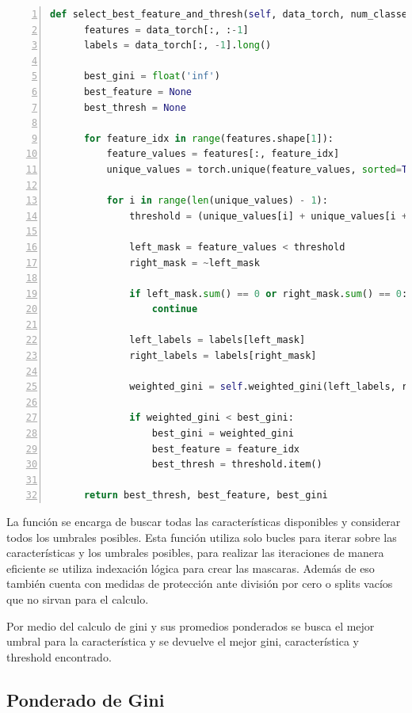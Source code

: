 \documentclass[12pt,a4paper]{article}
\begin{document}
    \begin{lstlisting}[language=Python, numbers=left, basicstyle=\ttfamily\tiny,label={lst:lstlisting3}]
def select_best_feature_and_thresh(self, data_torch, num_classes=2):
      features = data_torch[:, :-1]
      labels = data_torch[:, -1].long()

      best_gini = float('inf')
      best_feature = None
      best_thresh = None

      for feature_idx in range(features.shape[1]):
          feature_values = features[:, feature_idx]
          unique_values = torch.unique(feature_values, sorted=True)

          for i in range(len(unique_values) - 1):
              threshold = (unique_values[i] + unique_values[i + 1]) / 2

              left_mask = feature_values < threshold
              right_mask = ~left_mask

              if left_mask.sum() == 0 or right_mask.sum() == 0:
                  continue

              left_labels = labels[left_mask]
              right_labels = labels[right_mask]

              weighted_gini = self.weighted_gini(left_labels, right_labels, num_classes)

              if weighted_gini < best_gini:
                  best_gini = weighted_gini
                  best_feature = feature_idx
                  best_thresh = threshold.item()

      return best_thresh, best_feature, best_gini
    \end{lstlisting}

La función se encarga de buscar todas las características disponibles y considerar todos los umbrales posibles.
Esta función utiliza solo bucles para iterar sobre las características y los umbrales posibles,
para realizar las iteraciones de manera eficiente se utiliza indexación lógica para crear las mascaras.
Además de eso también cuenta con medidas de protección ante división por cero o splits vacíos que no sirvan para el calculo.

Por medio del calculo de gini y sus promedios ponderados se busca el mejor umbral para la característica y se devuelve el mejor gini, característica y threshold encontrado.

\subsection{Ponderado de Gini}\label{subsec:ponderado-de-gini}
\end{document}
